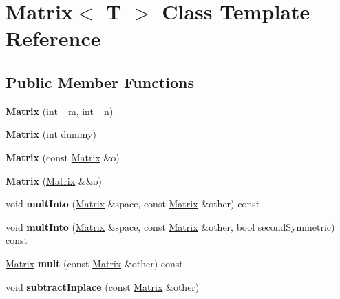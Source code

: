 \hypertarget{class_matrix}{}\section{Matrix$<$ T $>$ Class Template Reference}
\label{class_matrix}
\subsection*{Public Member Functions}
\begin{DoxyCompactItemize}
\item 
\mbox{\label{class_matrix_a8e63c9cbaaaa5700b029af44ccb76c73}} 
{\bfseries Matrix} (int \+\_\+m, int \+\_\+n)
\item 
\mbox{\label{class_matrix_ac589bb328aa3e0eb6411564a3e87b52e}} 
{\bfseries Matrix} (int dummy)
\item 
\mbox{\label{class_matrix_a015b03ab9c56bc8620d987a0b4fc4f0d}} 
{\bfseries Matrix} (const \mbox{\hyperlink{class_matrix}{Matrix}} \&o)
\item 
\mbox{\label{class_matrix_ac3273da68b57c2e61a3b6bf468a69d7f}} 
{\bfseries Matrix} (\mbox{\hyperlink{class_matrix}{Matrix}} \&\&o)
\item 
\mbox{\label{class_matrix_af7565348aa0284e36cbda0bade890c77}} 
void {\bfseries mult\+Into} (\mbox{\hyperlink{class_matrix}{Matrix}} \&space, const \mbox{\hyperlink{class_matrix}{Matrix}} \&other) const
\item 
\mbox{\label{class_matrix_a6a63055b3fd0b23bd07720cf4c3cf319}} 
void {\bfseries mult\+Into} (\mbox{\hyperlink{class_matrix}{Matrix}} \&space, const \mbox{\hyperlink{class_matrix}{Matrix}} \&other, bool second\+Symmetric) const
\item 
\mbox{\label{class_matrix_ab1bb1dae649d99c84aab6501de899422}} 
\mbox{\hyperlink{class_matrix}{Matrix}} {\bfseries mult} (const \mbox{\hyperlink{class_matrix}{Matrix}} \&other) const
\item 
\mbox{\label{class_matrix_a43aa15e36228d672cb817b5dbca00f58}} 
void {\bfseries subtract\+Inplace} (const \mbox{\hyperlink{class_matrix}{Matrix}} \&other)

\end{DoxyCompactItemize}
